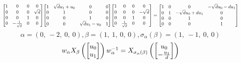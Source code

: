 \documentclass[11pt]{article}
\theoremstyle{definition}
\begin{document}
\[
\scaletoalign{\textwidth}{{\left[\begin{matrix}1 & 0 & 0 & 0\\0 & 0 & 0 & \sqrt{d}\\0 & 0 & 1 & 0\\0 & - \frac{1}{\sqrt{d}} & 0 & 0\end{matrix}\right]} {\left[\begin{matrix}1 & \sqrt{d} u_{1} + u_{0} & 0 & 0\\0 & 1 & 0 & 0\\0 & 0 & 1 & 0\\0 & 0 & \sqrt{d} u_{1} - u_{0} & 1\end{matrix}\right]} {\left[\begin{matrix}1 & 0 & 0 & 0\\0 & 0 & 0 & - \sqrt{d}\\0 & 0 & 1 & 0\\0 & \frac{1}{\sqrt{d}} & 0 & 0\end{matrix}\right]} = {\left[\begin{matrix}1 & 0 & 0 & - \sqrt{d} u_{0} - d u_{1}\\0 & 1 & - \sqrt{d} u_{0} + d u_{1} & 0\\0 & 0 & 1 & 0\\0 & 0 & 0 & 1\end{matrix}\right]}}
\]
\[
\alpha = \left( 0, \  -2, \  0, \  0\right), \beta = \left( 1, \  1, \  0, \  0\right), \sigma_{\alpha}(\beta) = \left( 1, \  -1, \  0, \  0\right)
\]
\[
\scaletoalign{\textwidth}{w_{\alpha} X_{\beta}\left(\left[\begin{matrix}u_{0}\\u_{1}\end{matrix}\right]\right) w_{\alpha}^{-1} = X_{\sigma_{\alpha}\left(\beta\right)}\left(\left[\begin{matrix}u_{0}\\- \frac{u_{1}}{d}\end{matrix}\right]\right)}
\]
\end{document}
